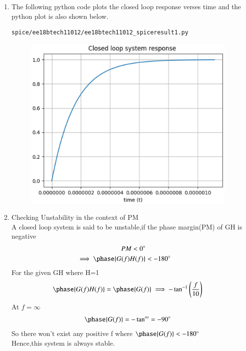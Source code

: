\begin{enumerate}[label=\thesubsection.\arabic*.,ref=\thesubsection.\theenumi]
\begin{figure}[!h]
\caption{}
\label{fig:ee18btech11012_spiceresult}
\end{figure}
\item The following python code plots the closed loop response verses time and the python plot is also shown below.
\begin{lstlisting}
spice/ee18btech11012/ee18btech11012_spiceresult1.py
\end{lstlisting}
\begin{figure}[!h]
\centering
\includegraphics[width=\columnwidth]{./figs/ee18btech11012_1/ee18btech11012_spiceresult1.eps}
\caption{}
\label{fig:ee18btech11012_spiceresult1}
\end{figure}
\item Checking Unstability in the context of PM \\
\solution A closed loop system is said to be unstable,if the phase margin(PM) of GH is negative\\
\begin{align}
PM < 0\degree\\
\implies \phase{G(f)H(f)} &< -180\degree
\end{align}
For the given GH where H=1
\begin{align}
\phase{G(f)H(f)} = \phase{G(f)} \implies -\tan^{-1}\brak{\frac{f}{10}} 
\end{align}
At $f = \infty$
\begin{align}
\phase{G(f)} =-\tan^{\infty}= -90\degree
\end{align}
So there won't exist any positive f where $\phase{G(f)} < -180\degree$\\
Hence,this system is always stable.

\end{enumerate}
